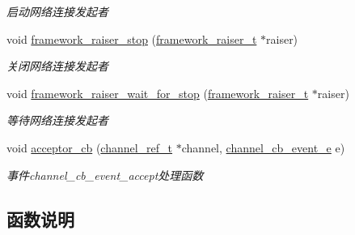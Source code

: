 \begin{DoxyCompactItemize}
\begin{DoxyCompactList}\small\item\em 启动网络连接发起者 \end{DoxyCompactList}\item 
void \hyperlink{a00057_a28061890dd7d07a16df39417ada87107_a28061890dd7d07a16df39417ada87107}{framework\+\_\+raiser\+\_\+stop} (\hyperlink{a00050_aa3ac31db191829c9e6db624d660a2563_aa3ac31db191829c9e6db624d660a2563}{framework\+\_\+raiser\+\_\+t} $\ast$raiser)
\begin{DoxyCompactList}\small\item\em 关闭网络连接发起者 \end{DoxyCompactList}\item 
void \hyperlink{a00057_a6f3a981ad344559bca4f51c73a0c678b_a6f3a981ad344559bca4f51c73a0c678b}{framework\+\_\+raiser\+\_\+wait\+\_\+for\+\_\+stop} (\hyperlink{a00050_aa3ac31db191829c9e6db624d660a2563_aa3ac31db191829c9e6db624d660a2563}{framework\+\_\+raiser\+\_\+t} $\ast$raiser)
\begin{DoxyCompactList}\small\item\em 等待网络连接发起者 \end{DoxyCompactList}\item 
void \hyperlink{a00057_a4ef7d97742bc9410f486ebc4e0b75e82_a4ef7d97742bc9410f486ebc4e0b75e82}{acceptor\+\_\+cb} (\hyperlink{a00050_a151271c9d188ef28d4d24bb81dcc1263_a151271c9d188ef28d4d24bb81dcc1263}{channel\+\_\+ref\+\_\+t} $\ast$channel, \hyperlink{a00050_aaf2cba5d4035f3d56350b59342ebf65c_aaf2cba5d4035f3d56350b59342ebf65c}{channel\+\_\+cb\+\_\+event\+\_\+e} e)
\begin{DoxyCompactList}\small\item\em 事件channel\+\_\+cb\+\_\+event\+\_\+accept处理函数 \end{DoxyCompactList}\end{DoxyCompactItemize}


\subsection{函数说明}
\hypertarget{a00057_ae1caed5e3ea73d6e6c98ddf1131310da_ae1caed5e3ea73d6e6c98ddf1131310da}{}
